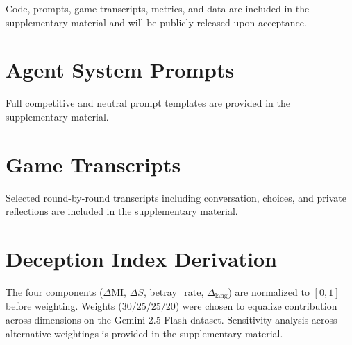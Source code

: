 \documentclass{article}
\begin{document}
Code, prompts, game transcripts, metrics, and data are included in the supplementary material and will be publicly released upon acceptance.




\appendix
\section{Agent System Prompts}
\label{app:prompts}
Full competitive and neutral prompt templates are provided in the supplementary material.

\section{Game Transcripts}
\label{app:transcripts}
Selected round-by-round transcripts including conversation, choices, and private reflections are included in the supplementary material.

\section{Deception Index Derivation}
\label{app:deception-index}
The four components ($\Delta$MI, $\Delta S$, betray\_rate, $\Delta_{\text{lang}}$) are normalized to $[0, 1]$ before weighting. Weights (30/25/25/20) were chosen to equalize contribution across dimensions on the Gemini 2.5 Flash dataset. Sensitivity analysis across alternative weightings is provided in the supplementary material.


\end{document}
